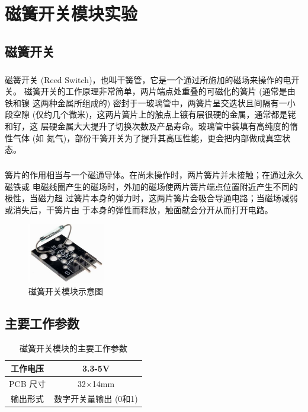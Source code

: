 \documentclass[UTF8, oneside]{ctexbook}
\begin{document}
\chapter{磁簧开关模块实验}

\section{磁簧开关}
\paragraph{}
磁簧开关 (Reed Switch)，也叫干簧管，它是一个通过所施加的磁场来操作的电开关。
磁簧开关的工作原理非常简单，两片端点处重叠的可磁化的簧片 (通常是由铁和镍
这两种金属所组成的) 密封于一玻璃管中，两簧片呈交迭状且间隔有一小段空隙 
(仅约几个微米)，这两片簧片上的触点上镀有层很硬的金属，通常都是铑和钌，这
层硬金属大大提升了切换次数及产品寿命。玻璃管中装填有高纯度的惰性气体 (如
氮气)，部份干簧开关为了提升其高压性能，更会把内部做成真空状态。

\paragraph{}
簧片的作用相当与一个磁通导体。在尚未操作时，两片簧片并未接触；在通过永久磁铁或
电磁线圈产生的磁场时，外加的磁场使两片簧片端点位置附近产生不同的极性，当磁力超
过簧片本身的弹力时，这两片簧片会吸合导通电路；当磁场减弱或消失后，干簧片由
于本身的弹性而释放，触面就会分开从而打开电路。

\begin{figure}[h]
    \centering
    \includegraphics[width=0.3\textwidth]{./result/sensor/20/sensor.png}
    \caption{磁簧开关模块示意图}
    \label{20_sensor}
\end{figure}

\section{主要工作参数}
\begin{table}[h]
    \centering
    \begin{tabular}{|c|c|}
    \hline
    工作电压   & 3.3-5V         \\ \hline
    PCB 尺寸 & 32$\times$14mm \\ \hline
    输出形式   & 数字开关量输出 (0和1)  \\ \hline
    \end{tabular}
    \caption{磁簧开关模块的主要工作参数}
\end{table}
\end{document}
